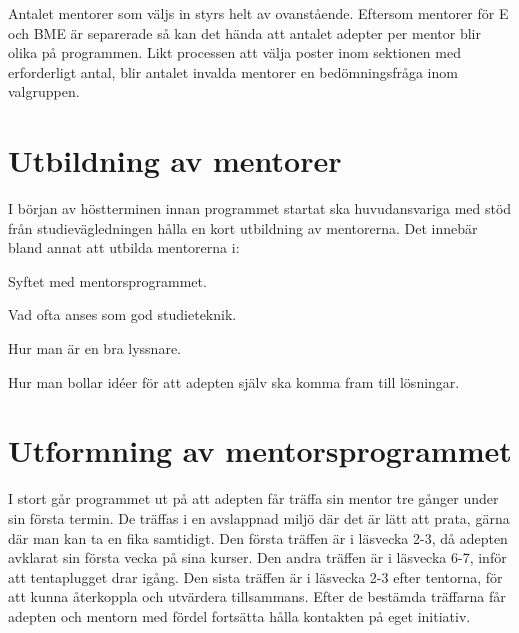 \documentclass[10pt]{article}
\begin{document}
    Antalet mentorer som väljs in styrs helt av ovanstående.
    Eftersom mentorer för E och BME är separerade så kan det hända att antalet adepter per mentor blir olika på programmen.
    Likt processen att välja poster inom sektionen med erforderligt antal, blir antalet invalda mentorer en bedömningsfråga inom valgruppen.

    \newpage

    \section{Utbildning av mentorer}
    I början av höstterminen innan programmet startat ska huvudansvariga med stöd från studievägledningen hålla en kort utbildning av mentorerna.
    Det innebär bland annat att utbilda mentorerna i:
    \begin{dashlist}
        \item Syftet med mentorsprogrammet.
        \item Vad ofta anses som god studieteknik.
        \item Hur man är en bra lyssnare.
        \item Hur man bollar idéer för att adepten själv ska komma fram till lösningar.
    \end{dashlist}






    \section{Utformning av mentorsprogrammet}
    I stort går programmet ut på att adepten får träffa sin mentor tre gånger under sin första termin.
    De träffas i en avslappnad miljö där det är lätt att prata, gärna där man kan ta en fika samtidigt.
    Den första träffen är i läsvecka 2-3, då adepten avklarat sin första vecka på sina kurser.
    Den andra träffen är i läsvecka 6-7, inför att tentaplugget drar igång.
    Den sista träffen är i läsvecka 2-3 efter tentorna, för att kunna återkoppla och utvärdera tillsammans.
    Efter de bestämda träffarna får adepten och mentorn med fördel fortsätta hålla kontakten på eget initiativ.
\end{document}
